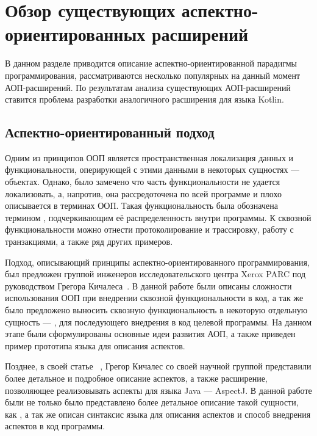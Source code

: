 \chapter{Обзор существующих аспектно-ориентированных расширений}
\label{ch:aop_overview}
В данном разделе приводится описание аспектно-ориентированной парадигмы
программирования, рассматриваются несколько популярных на данный момент
АОП-расширений.
По результатам анализа существующих АОП-расширений ставится проблема разработки
аналогичного расширения для языка Kotlin.
\section{Аспектно-ориентированный подход}
\label{sec:aop_description}
Одним из принципов ООП является пространственная локализация данных и функциональности, оперирующей с этими данными в некоторых сущностях --- объектах.
Однако, было замечено что часть функциональности не удается локализовать, а, напротив, она рассредоточена по всей программе и плохо описывается в терминах ООП.
Такая функциональность была обозначена термином , подчеркивающим её распределенность внутри программы.
К сквозной функциональности можно отнести протоколирование и трассировку, работу с транзакциями, а также ряд других примеров.

Подход, описывающий принципы аспектно-ориентированного программирования, был
предложен группой инженеров исследовательского центра Xerox PARC под
руководством Грегора Кичалеса~\cite{kiczales_aop}.
В данной работе были описаны сложности использования ООП при внедрении сквозной
функциональности в код, а так же было предложено выносить сквозную
функциональность в некоторую отдельную сущность --- , для
последующего внедрения в код целевой программы.
На данном этапе были сформулированы основные идеи развития АОП, а также приведен
пример прототипа языка для описания аспектов.

Позднее, в своей статье ~\cite{kiczales_aspectj},
Грегор Кичалес со своей научной группой представили более детальное и подробное
описание аспектов, а также расширение, позволяющее реализовывать аспекты для
языка Java --- AspectJ.
В данной работе были не только было представлено более детальное описание такой
сущности, как , а так же описан синтаксис языка для описания
аспектов и способ внедрения аспектов в код программы.

